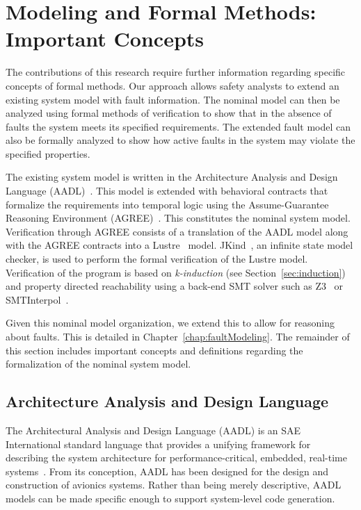 \section{Modeling and Formal Methods: Important Concepts}
\label{sec:concepts}
The contributions of this research require further information regarding specific concepts of formal methods. Our approach allows safety analysts to extend an existing system model with fault information. The nominal model can then be analyzed using formal methods of verification to show that in the absence of faults the system meets its specified requirements. The extended fault model can also be formally analyzed to show how active faults in the system may violate the specified properties. 

The existing system model is written in the Architecture Analysis and Design Language (AADL)~\cite{AADL_Standard}. This model is extended with behavioral contracts that formalize the requirements into temporal logic using the Assume-Guarantee Reasoning Environment (AGREE)~\cite{cofer2012compositional}. This constitutes the nominal system model. Verification through AGREE consists of a translation of the AADL model along with the AGREE contracts into a Lustre~\cite{Halbwachs91:IEEE} model. JKind~\cite{2017arXiv171201222G}, an infinite state model checker, is used to perform the formal verification of the Lustre model. Verification of the program is based on {\em k-induction} (see Section~\ref{sec:induction}) and property directed reachability using a back-end SMT solver such as Z3~\cite{z3} or SMTInterpol~\cite{smtInterpol}. 

Given this nominal model organization, we extend this to allow for reasoning about faults. This is detailed in Chapter~\ref{chap:faultModeling}. The remainder of this section includes important concepts and definitions regarding the formalization of the nominal system model. 

\subsection{Architecture Analysis and Design Language}
The Architectural Analysis and Design Language (AADL) is an SAE International standard language that provides a unifying framework for describing the system architecture for performance-critical, embedded, real-time systems~\cite{AADL_Standard,FeilerModelBasedEngineering2012}. From its conception, AADL has been designed for the design and construction of avionics systems.  Rather than being merely descriptive, AADL models can be made specific enough to support system-level code generation.  
 
